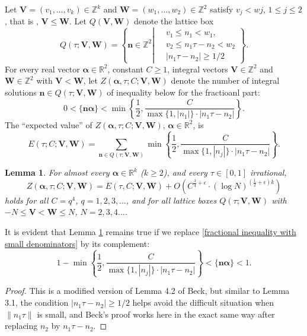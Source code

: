 \documentclass[11pt]{article}
\newtheorem{lem}[thm]{Lemma}
\newcommand{\beq}{\begin{equation}}
\newcommand{\eeq}{\end{equation}}
\newcommand{\fc}{\frac}
\renewcommand{\l}{\left}
\renewcommand{\r}{\right}
\newcommand{\Z}{\mathbb{Z}}
\newcommand{\R}{\mathbb{R}}
\renewcommand{\a}{\alpha}
\newcommand{\e}{\epsilon}
\renewcommand{\(}{\left(}
\renewcommand{\)}{\right)}
\renewcommand{\bf}{\mathbf}
\newcommand{\bal}{\begin{aligned}}
\newcommand{\eal}{\end{aligned}}
\newcommand{\V}{\bf{V}}
\newcommand{\W}{\bf{W}}
\newcommand{\n}{\bf{n}}
\newcommand{\bma}{\bm{\alpha}}
\newcommand{\<}{\langle}
\renewcommand{\>}{\rangle}
\begin{document}
Let $\bf{V}=(v_1,\dots,v_k)\in \Z^k$ and $\bf{W}=(w_1,\dots, w_2)\in \Z^2$ satisfy $v_j<wj$, $1\le j\le 2$, that is , $\bf{V}\le \bf{W}$. Let $Q(\bf{V},\bf{W})$ denote the lattice box
\beq\label{Lattic box}
Q(\tau; \V,\W)=\l\{\bf{n}\in \Z^2 \l| \ \bal & v_1\le n_1<w_1, \\ 
& v_2\le n_1\tau-n_2<w_2 \\
& |n_1\tau-n_2|\ge 1/2
\eal
\r. \r\}.
\eeq
For every real vector $\bm{\a}\in \R^2$, constant $C\ge 1$, integral vectors $\V\in \Z^2$ and $\W\in\Z^2$ with $\V<\W$, let $Z(\bm{\a},\tau; C; \V,\W)$ denote the number of integral solutions $\bf{n}\in Q(\tau; \V,\W)$ of inequality below for the fractioanl part:
\beq\label{fractional inequality with small denominators}
0<\{\n\bm{\a}\}<\min\l\{ \fc{1}{2},\fc{C}{\max\{1,|n_1|\}\cdot |n_1\tau-n_2|}\r\}.
\eeq
The ``expected value'' of $Z(\bm{\a},\tau; C; \V,\W)$, $\bma\in\R^2$, is
\beq\label{Expected value for solutions of fractional inequality}
E(\tau; C;\V,\W)=\sum_{\n\in Q(\tau; \V,\W)} \min\l\{ \fc{1}{2},\fc{C}{\max\{1,|n_j|\}\cdot |n_1\tau-n_2|}\r\}.
\eeq
\begin{lem}\label{Lemma of second moment for small terms}
For almost every $\bma\in \R^k$ ($k\ge 2$), and every $\tau\in [0,1]$ irrational, 
$$
Z(\bma,\tau; C; \V,\W)=E(\tau, C;\V,\W)+O(C^{\fc{3}{4}+\e}\cdot(\log N)^{(\fc{1}{2}+\e)k} )
$$
holds for all $C=q^4$, $q=1,2,3,\dots$, and for all lattice boxes $Q(\tau; \V,\W)$ with $-N\le \V<\W\le N$, $N=2,3,4\dots$. 
\end{lem}
It is evident that Lemma \ref{Lemma of second moment for small terms} remains true if we replace \eqref{fractional inequality with small denominators} by its complement:
$$
1-\min\l\{ \fc{1}{2},\fc{C}{\max\{1,|n_j|\}\cdot |n_1\tau-n_2|}\r\}<\{\n\bm{\a}\}<1.
$$
\begin{proof}
This is a modified version of Lemma 4.2 of Beck\cite{Beck}, but similar to Lemma 3.1, the condition $|n_1\tau-n_2|\ge 1/2$ helps avoid the difficult situation when $\|n_1\tau\|$ is small, and Beck's proof works here in the exact same way after replacing $n_2$ by $n_1\tau-n_2$. 
\end{proof}
\end{document}

